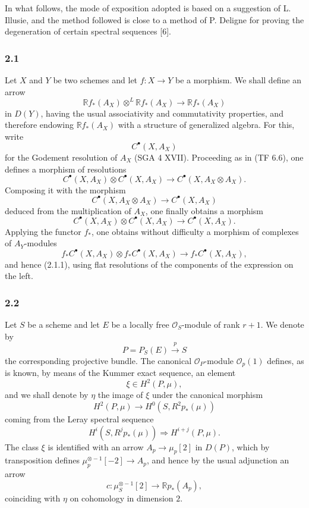 \documentclass[11pt]{article}
\begin{document}
In what follows, the mode of exposition adopted is based on a suggestion of L. Illusie, and the method followed is close to a method of P. Deligne for proving the degeneration of certain spectral sequences [6].

\subsubsection*{2.1}
Let $X$ and $Y$ be two schemes and let $f:X\to Y$ be a morphism. We shall define an arrow
\[
\mathbb{R}f_*(A_X)\otimes^L \mathbb{R}f_*(A_X)\longrightarrow \mathbb{R}f_*(A_X)
\tag{2.1.1}
\]
in $D(Y)$, having the usual associativity and commutativity properties, and therefore endowing $\mathbb{R}f_*(A_X)$ with a structure of generalized algebra. For this, write
\[
C^{\bullet}(X,A_X)
\]
for the Godement resolution of $A_X$ (SGA 4 XVII). Proceeding as in (TF 6.6), one defines a morphism of resolutions
\[
C^{\bullet}(X,A_X)\otimes C^{\bullet}(X,A_X)\longrightarrow C^{\bullet}(X,A_X\otimes A_X).
\]
Composing it with the morphism
\[
C^{\bullet}(X,A_X\otimes A_X)\longrightarrow C^{\bullet}(X,A_X)
\]
deduced from the multiplication of $A_X$, one finally obtains a morphism
\[
C^{\bullet}(X,A_X)\otimes C^{\bullet}(X,A_X)\longrightarrow C^{\bullet}(X,A_X).
\tag{2.1.2}
\]
Applying the functor $f_*$, one obtains without difficulty a morphism of complexes of $A_Y$-modules
\[
f_*C^{\bullet}(X,A_X)\otimes f_*C^{\bullet}(X,A_X)\longrightarrow f_*C^{\bullet}(X,A_X),
\]
and hence (2.1.1), using flat resolutions of the components of the expression on the left.

\subsubsection*{2.2}
Let $S$ be a scheme and let $E$ be a locally free $\mathcal O_S$-module of rank $r+1$. We denote by
\[
P=P_S(E)\xrightarrow{p}S
\]
the corresponding projective bundle. The canonical $\mathcal O_P$-module $\mathcal O_p(1)$ defines, as is known, by means of the Kummer exact sequence, an element
\[
\xi\in H^2(P,\mu),
\]
and we shall denote by $\eta$ the image of $\xi$ under the canonical morphism
\[
H^2(P,\mu)\longrightarrow H^0(S,R^2p_*(\mu))
\]
coming from the Leray spectral sequence
\[
H^i(S,R^jp_*(\mu))\Rightarrow H^{i+j}(P,\mu).
\]
The class $\xi$ is identified with an arrow $A_p\to\mu_p[2]$ in $D(P)$, which by transposition defines $\mu_p^{\otimes -1}[-2]\to A_p$, and hence by the usual adjunction an arrow
\[
c:\mu_S^{\otimes -1}[2]\longrightarrow \mathbb{R}p_*(A_p),
\]
coinciding with $\eta$ on cohomology in dimension $2$.
\end{document}
